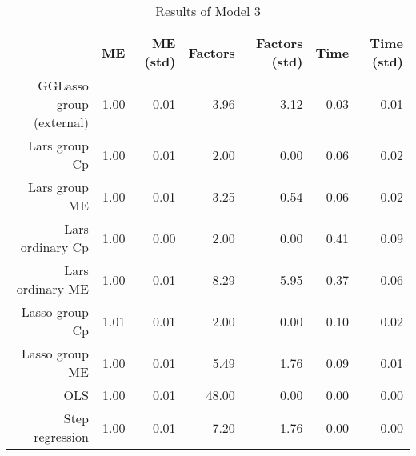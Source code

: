 \begin{table}[ht]
\centering
\begin{tabular}{rrrrrrr}
  \hline
 & ME & ME (std) & Factors & Factors (std) & Time & Time (std) \\ 
  \hline
GGLasso group (external) & 1.00 & 0.01 & 3.96 & 3.12 & 0.03 & 0.01 \\ 
  Lars group Cp & 1.00 & 0.01 & 2.00 & 0.00 & 0.06 & 0.02 \\ 
  Lars group ME & 1.00 & 0.01 & 3.25 & 0.54 & 0.06 & 0.02 \\ 
  Lars ordinary Cp & 1.00 & 0.00 & 2.00 & 0.00 & 0.41 & 0.09 \\ 
  Lars ordinary ME & 1.00 & 0.01 & 8.29 & 5.95 & 0.37 & 0.06 \\ 
  Lasso group Cp & 1.01 & 0.01 & 2.00 & 0.00 & 0.10 & 0.02 \\ 
  Lasso group ME & 1.00 & 0.01 & 5.49 & 1.76 & 0.09 & 0.01 \\ 
  OLS & 1.00 & 0.01 & 48.00 & 0.00 & 0.00 & 0.00 \\ 
  Step regression & 1.00 & 0.01 & 7.20 & 1.76 & 0.00 & 0.00 \\ 
   \hline
\end{tabular}
\caption{Results of Model 3} 
\end{table}
